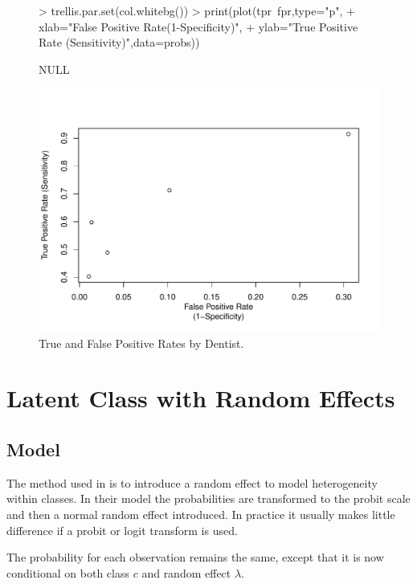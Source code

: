 \begin{figure}
  \centering
\begin{Schunk}
\begin{Sinput}
> trellis.par.set(col.whitebg())
> print(plot(tpr~fpr,type="p",
+ 	xlab="False Positive Rate\n(1-Specificity)",
+ 	ylab="True Positive Rate (Sensitivity)",data=probs))
\end{Sinput}
\begin{Soutput}
NULL
\end{Soutput}
\end{Schunk}
\includegraphics{randomLCA-example-022}
  \caption{True and False Positive Rates by Dentist.}
  \label{fig:truefalse}
\end{figure}

\section{Latent Class with Random Effects}

\subsection{Model}

The method used in \citet{qu:1996} is to introduce a random effect to model heterogeneity within classes. In their model the probabilities are transformed to the probit scale and then a normal random effect introduced. In practice it usually makes little difference if a probit or logit transform is used.

The probability for each observation remains the same, except that it is now conditional on both class $c$ and random effect $\lambda$.

